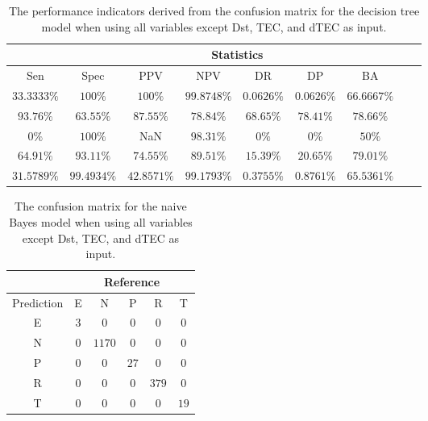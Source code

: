 \begin{table}[!ht]
	\centering
	\begin{tabular}{|c|c|c|c|c|c|c|c|c|}
		\hline
		 & \multicolumn{7}{c|}{Statistics} \\ \hline
		Sen & Spec & PPV & NPV & DR & DP & BA \\ \hline
		$33.3333\%$ & $100\%$ & $100\%$ & $99.8748\%$ & $0.0626\%$ & $0.0626\%$ & $66.6667\%$ \\ \hline
		$93.76\%$ & $63.55\%$ & $87.55\%$ & $78.84\%$ & $68.65\%$ & $78.41\%$ & $78.66\%$ \\ \hline
		$0\%$ & $100\%$ & NaN & $98.31\%$ & $0\%$ & $0\%$ & $50\%$ \\ \hline
		$64.91\%$ & $93.11\%$ & $74.55\%$ & $89.51\%$ & $15.39\%$ & $20.65\%$ & $79.01\%$ \\ \hline
		$31.5789\%$ & $99.4934\%$ & $42.8571\%$ & $99.1793\%$ & $0.3755\%$ & $0.8761\%$ & $65.5361\%$ \\ \hline
	\end{tabular}
	\caption{The performance indicators derived from the confusion matrix for the decision tree model when using all variables except Dst, TEC, and dTEC as input.}
	\label{tab:cs:noTEC:C5.0}
\end{table}

\begin{table}[!ht]
	\centering
	\begin{tabular}{|c|c|c|c|c|c|}
		\hline
		 & \multicolumn{5}{|c|}{Reference} \\ \hline
		 Prediction & E & N & P & R & T \\ \hline
		 E & $3$ & $0$ & $0$ & $0$ & $0$ \\ \hline
		 N & $0$ & $1170$ & $0$ & $0$ & $0$ \\ \hline
		 P & $0$ & $0$ & $27$ & $0$ & $0$ \\ \hline
		 R & $0$ & $0$ & $0$ & $379$ & $0$ \\ \hline
		 T & $0$ & $0$ & $0$ & $0$ & $19$ \\ \hline
	\end{tabular}
	\caption{The confusion matrix for the naive Bayes model when using all variables except Dst, TEC, and dTEC as input.}
	\label{tab:cm:noTEC:nb}
\end{table}

